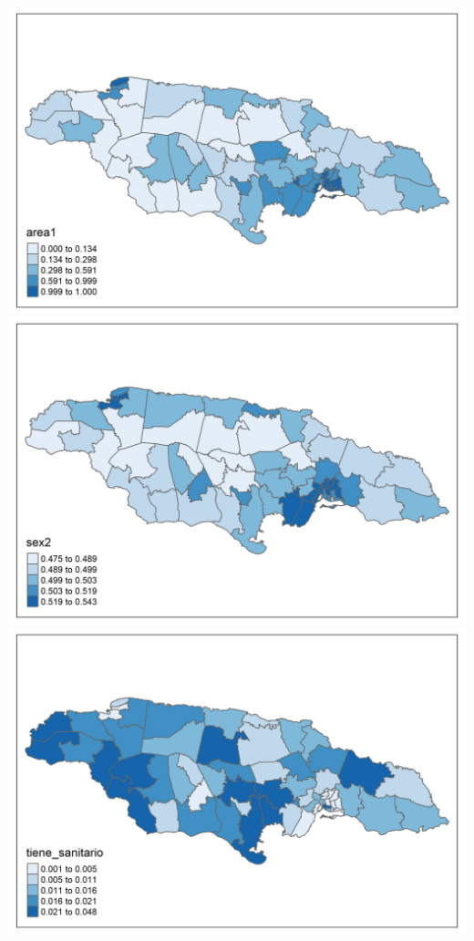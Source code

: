 \documentclass[
  12pt,
]{book}
\begin{document}
\includegraphics[width=4\linewidth]{Recursos/01_Session1/18_plot_Censo/area1}
\includegraphics[width=4\linewidth]{Recursos/01_Session1/18_plot_Censo/sex2}
\includegraphics[width=4\linewidth]{Recursos/01_Session1/18_plot_Censo/tiene_sanitario}
\end{document}

